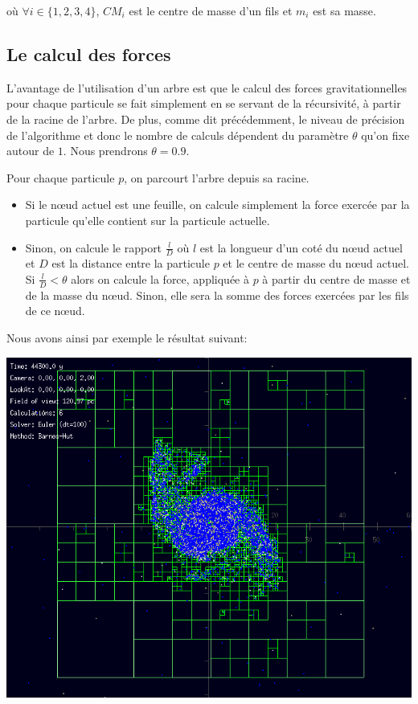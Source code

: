 où $\forall i\in \{1,2,3,4\}$, $CM_i$ est le centre de masse d'un fils et $m_i$ est sa masse.

\subsection{Le calcul des forces}

L'avantage de l'utilisation d'un arbre est que le calcul des forces gravitationnelles pour chaque particule se fait simplement en se servant de la récursivité, à partir de la racine de l'arbre. De plus, comme dit précédemment, le niveau de précision de l'algorithme et donc le nombre de calculs dépendent du paramètre $\theta$ qu'on fixe autour de $1$. Nous prendrons $\theta = 0.9$.

Pour chaque particule $p$, on parcourt l'arbre depuis sa racine.

\begin{itemize}
\item Si le nœud actuel est une feuille, on calcule simplement la force exercée par la particule qu'elle contient sur la particule actuelle.

\item Sinon, on calcule le rapport $\frac{l}{D}$ où $l$ est la
longueur d'un coté du nœud actuel  et $D$ est la distance entre la particule $p$ et le centre de masse du nœud actuel.
Si $\frac{l}{D} < \theta$ alors on calcule la force, appliquée à $p$ à partir du centre de masse et de la masse du nœud. Sinon, elle sera la somme des forces exercées par les fils de ce nœud.
\end{itemize}

\newpage
Nous avons ainsi par exemple le résultat suivant:
\begin{center}
\includegraphics[scale=0.8]{./images/BH_tree.png}
\captionsetup{hypcap=false}
\label{fig7}
\end{center}

